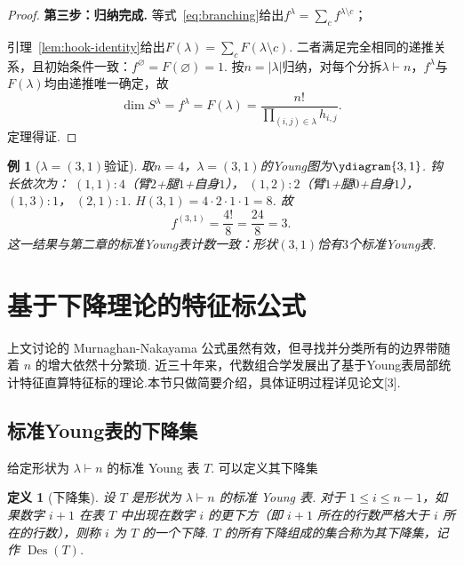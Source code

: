 \documentclass{sjtureport}
\newtheorem{definition}{定义}[chapter]
\newtheorem{example}{例}[chapter]
\begin{document}
\begin{proof}
\medskip
\noindent\textbf{第三步：归纳完成.}\quad
等式~\eqref{eq:branching}给出$f^\lambda = \sum_{c} f^{\lambda\setminus c}$；\par
引理~\ref{lem:hook-identity}给出$F(\lambda) = \sum_c F(\lambda\setminus c)$. 二者满足完全相同的递推关系，且初始条件一致：$f^\varnothing = F(\varnothing) = 1$. 按$n=|\lambda|$归纳，对每个分拆$\lambda\vdash n$，$f^\lambda$与$F(\lambda)$均由递推唯一确定，故
\begin{equation*}
    \dim S^\lambda = f^\lambda = F(\lambda) = \frac{n!}{\prod_{(i,j)\in\lambda} h_{i,j}}.
\end{equation*}
定理得证. 
\end{proof}

\begin{example}[$\lambda=(3,1)$验证]
    取$n=4$，$\lambda=(3,1)$的Young图为$\ydiagram{3,1}$. 钩长依次为：
    $(1,1):4$（臂$2$+腿$1$+自身$1$），
    $(1,2):2$（臂$1$+腿$0$+自身$1$），
    $(1,3):1$，
    $(2,1):1$. 
    $H(3,1)=4\cdot2\cdot1\cdot1=8$. 故
    \begin{equation*}
        f^{(3,1)} = \frac{4!}{8} = \frac{24}{8} = 3.
    \end{equation*}
    这一结果与第二章的标准Young表计数一致：形状$(3,1)$恰有$3$个标准Young表. 
\end{example}


\section{基于下降理论的特征标公式}

上文讨论的 Murnaghan-Nakayama 公式虽然有效，但寻找并分类所有的边界带随着 $n$ 的增大依然十分繁琐. 近三十年来，代数组合学发展出了基于Young表局部统计特征直算特征标的理论.本节只做简要介绍，具体证明过程详见论文[3].

\subsection{标准Young表的下降集}

给定形状为 $\lambda \vdash n$ 的标准 Young 表 $T$. 可以定义其下降集
\begin{definition}[下降集]
    设 $T$ 是形状为 $\lambda \vdash n$ 的标准 Young 表. 对于 $1 \leq i \leq n-1$，如果数字 $i+1$ 在表 $T$ 中出现在数字 $i$ 的更下方（即 $i+1$ 所在的行数严格大于 $i$ 所在的行数），则称 $i$ 为 $T$ 的一个\emph{下降}. 
    $T$ 的所有下降组成的集合称为其\emph{下降集}，记作 $\operatorname{Des}(T)$. 
\end{definition}
\end{document}
